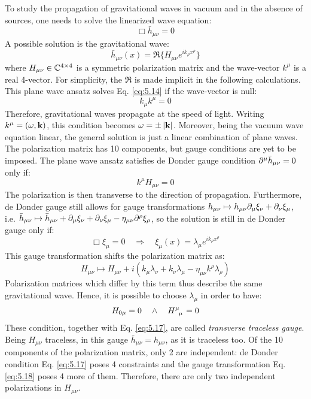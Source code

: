 To study the propagation of gravitational waves in vacuum and in the absence of sources, one needs to solve the linearized wave equation:
\begin{equation}
  \Box \bar{h}_{\mu \nu} = 0
  \label{eq:5.14}
\end{equation}
A possible solution is the gravitational wave:
\begin{equation}
  \bar{h}_{\mu \nu}(x) = \Re \{ H_{\mu \nu} e^{i k_\rho x^\rho} \}
  \label{eq:5.15}
\end{equation}
where $ H_{\mu \nu} \in \mathbb{C}^{4 \times 4} $ is a symmetric polarization matrix and the wave-vector $ k^\mu $ is a real 4-vector. For simplicity, the $ \Re $ is made implicit in the following calculations. This plane wave ansatz solves Eq. \ref{eq:5.14} if the wave-vector is null:
\begin{equation}
  k_\mu k^\mu = 0
  \label{eq:5.16}
\end{equation}
Therefore, gravitational waves propagate at the speed of light. Writing $ k^\mu = (\omega, \mathbf{k}) $, this condition becomes $ \omega = \pm \left\lvert\mathbf{k}\right\rvert $. Moreover, being the vacuum wave equation linear, the general solution is just a linear combination of plane waves.\\
The polarization matrix has 10 components, but gauge conditions are yet to be imposed. The plane wave ansatz satisfies de Donder gauge condition $ \partial^\mu \bar{h}_{\mu \nu} = 0 $ only if:
\begin{equation}
  k^\mu  H_{\mu \nu} = 0
  \label{eq:5.17}
\end{equation}
The polarization is then transverse to the direction of propagation. Furthermore, de Donder gauge still allows for gauge transformations $ h_{\mu \nu} \mapsto h_{\mu \nu} \partial_\mu \xi_\nu + \partial_\nu \xi_\mu $, i.e. $ \bar{h}_{\mu \nu} \mapsto \bar{h}_{\mu \nu} + \partial_\mu \xi_\nu + \partial_\nu \xi_\mu - \eta_{\mu \nu} \partial^\rho \xi_\rho $, so the solution is still in de Donder gauge only if:
\begin{equation*}
  \Box \xi_\mu = 0 \quad \Rightarrow \quad \xi_\mu(x) = \lambda_\mu e^{i k_\rho x^\rho}
\end{equation*}
This gauge transformation shifts the polarization matrix as:
\begin{equation}
  H_{\mu \nu} \mapsto H_{\mu \nu} + i \left( k_\mu \lambda_\nu + k_\nu \lambda_\mu - \eta_{\mu \nu} k^\rho \lambda_\rho \right)
  \label{eq:5.18}
\end{equation}
Polarization matrices which differ by this term thus describe the same gravitational wave. Hence, it is possible to choose $ \lambda_\mu $ in order to have:
\begin{equation}
  H_{0 \mu} = 0 \quad \land \quad \tensor{H}{^\mu_\mu} = 0
  \label{eq:5.19}
\end{equation}
These condition, together with Eq. \ref{eq:5.17}, are called \textit{transverse traceless gauge}. Being $ H_{\mu \nu} $ traceless, in this gauge $ \bar{h}_{\mu \nu} = h_{\mu \nu} $, as it is traceless too. Of the 10 components of the polarization matrix, only 2 are independent: de Donder condition Eq. \ref{eq:5.17} poses 4 constraints and the gauge transformation Eq. \ref{eq:5.18} poses 4 more of them. Therefore, there are only two independent polarizations in $ H_{\mu \nu} $.

